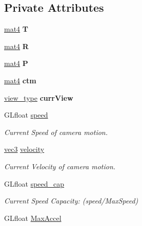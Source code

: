 \subsection*{Private Attributes}
\begin{DoxyCompactItemize}
\item 
\hypertarget{class_camera_aa4cb92b539c9a9707a12d7025ed889f6}{\hyperlink{class_angel_1_1mat4}{mat4} {\bfseries T}}\label{class_camera_aa4cb92b539c9a9707a12d7025ed889f6}

\item 
\hypertarget{class_camera_a8fd028120b18556c43ad86756e637fbc}{\hyperlink{class_angel_1_1mat4}{mat4} {\bfseries R}}\label{class_camera_a8fd028120b18556c43ad86756e637fbc}

\item 
\hypertarget{class_camera_a0bee6fbae6ec5960850a5fb858f3912a}{\hyperlink{class_angel_1_1mat4}{mat4} {\bfseries P}}\label{class_camera_a0bee6fbae6ec5960850a5fb858f3912a}

\item 
\hypertarget{class_camera_a9b1e81e3f5531390bb6a599dca0d2444}{\hyperlink{class_angel_1_1mat4}{mat4} {\bfseries ctm}}\label{class_camera_a9b1e81e3f5531390bb6a599dca0d2444}

\item 
\hypertarget{class_camera_a1fe2ef68d26bb98f0aa736948304eb64}{\hyperlink{class_camera_afdccec6d447490dcc80ab6b99f21d0e5}{view\-\_\-type} {\bfseries curr\-View}}\label{class_camera_a1fe2ef68d26bb98f0aa736948304eb64}

\item 
G\-Lfloat \hyperlink{class_camera_a308e92b5d3ef0eea5cac7745df6e28f4}{speed}
\begin{DoxyCompactList}\small\item\em Current Speed of camera motion. \end{DoxyCompactList}\item 
\hyperlink{struct_angel_1_1vec3}{vec3} \hyperlink{class_camera_a5b95c890f213db50f321380108b17ea1}{velocity}
\begin{DoxyCompactList}\small\item\em Current Velocity of camera motion. \end{DoxyCompactList}\item 
\hypertarget{class_camera_aa075ae6872228fc4db892533d9f6d881}{G\-Lfloat \hyperlink{class_camera_aa075ae6872228fc4db892533d9f6d881}{speed\-\_\-cap}}\label{class_camera_aa075ae6872228fc4db892533d9f6d881}

\begin{DoxyCompactList}\small\item\em Current Speed Capacity\-: (speed/\-Max\-Speed) \end{DoxyCompactList}\item 
\hypertarget{class_camera_a7817b2e83ad8f783e2822ec7771c6fe9}{G\-Lfloat \hyperlink{class_camera_a7817b2e83ad8f783e2822ec7771c6fe9}{Max\-Accel}}\label{class_camera_a7817b2e83ad8f783e2822ec7771c6fe9}


\end{DoxyCompactItemize}
